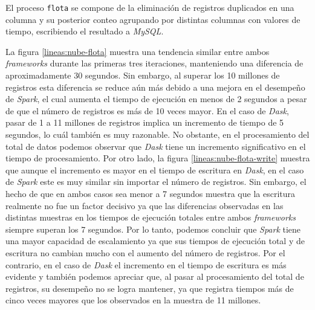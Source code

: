 El proceso \texttt{flota} se compone de la eliminación de registros duplicados en una columna y su posterior conteo agrupando por distintas columnas con valores de tiempo, escribiendo el resultado a \textit{MySQL}.

La figura \ref{lineas:nube-flota} muestra una tendencia similar entre ambos \textit{frameworks} durante las primeras tres iteraciones, manteniendo una diferencia de aproximadamente 30 segundos. Sin embargo, al superar los 10 millones de registros esta diferencia se reduce aún más debido a una mejora en el desempeño de \textit{Spark}, el cual aumenta el tiempo de ejecución en menos de 2 segundos a pesar de que el número de registros es más de 10 veces mayor. En el caso de \textit{Dask}, pasar de 1 a 11 millones de registros implica un incremento de tiempo de 5 segundos, lo cuál también es muy razonable. No obstante, en el procesamiento del total de datos podemos observar que \textit{Dask} tiene un incremento significativo en el tiempo de procesamiento. Por otro lado, la figura \ref{lineas:nube-flota-write} muestra que aunque el incremento es mayor en el tiempo de escritura en \textit{Dask}, en el caso de \textit{Spark} este es muy similar sin importar el número de registros. Sin embargo, el hecho de que en ambos casos sea menor a 7 segundos muestra que la escritura realmente no fue un factor decisivo ya que las diferencias observadas en las distintas muestras en los tiempos de ejecución totales entre ambos \textit{frameworks} siempre superan los 7 segundos. Por lo tanto, podemos concluir que \textit{Spark} tiene una mayor capacidad de escalamiento ya que sus tiempos de ejecución total y de escritura no cambian mucho con el aumento del número de registros. Por el contrario, en el caso de \textit{Dask} el incremento en el tiempo de escritura es más evidente y también podemos apreciar que, al pasar al procesamiento del total de registros, su desempeño no se logra mantener, ya que registra tiempos más de cinco veces mayores que los observados en la muestra de 11 millones. 



